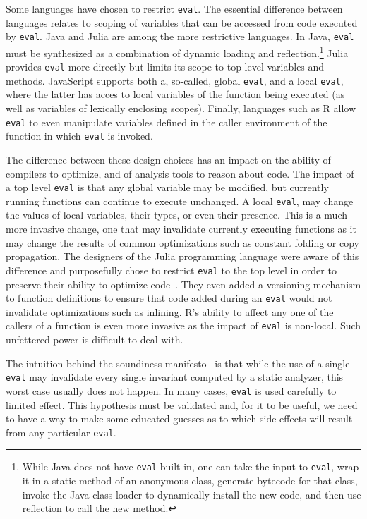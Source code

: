 \documentclass[USenglish,cleveref, autoref, thm-restate]{lipics-v2019}
\newcommand{\eval}{\texttt{eval}\xspace}
\begin{document}
Some languages have chosen to restrict \eval. The essential difference
between languages relates to scoping of variables that can be accessed from
code executed by \eval.  Java and Julia are among the more restrictive
languages. In Java, \eval must be synthesized as a combination of dynamic
loading and reflection.\footnote{While Java does not have \eval built-in,
  one can take the input to \eval, wrap it in a static method of an
  anonymous class, generate bytecode for that class, invoke the Java class
  loader to dynamically install the new code, and then use reflection to
  call the new method.} Julia provides \eval more directly but limits its
scope to top level variables and methods. JavaScript supports both a,
so-called, global \eval, and a local \eval, where the latter has acces to
local variables of the function being executed (as well as variables of
lexically enclosing scopes). Finally, languages such as R allow \eval to
even manipulate variables defined in the caller environment of the function in
which \eval is invoked.

The difference between these design choices has an impact on the ability of
compilers to optimize, and of analysis tools to reason about code. The
impact of a top level \eval is that any global variable may be modified, but
currently running functions can continue to execute unchanged. A local
\eval, may change the values of local variables, their types, or even their
presence. This is a much more invasive change, one that may invalidate
currently executing functions as it may change the results of common
optimizations such as constant folding or copy propagation. The designers of
the Julia programming language were aware of this difference and
purposefully chose to restrict \eval to the top level in order to preserve
their ability to optimize code~\cite{oopsla18a}. They even added a
versioning mechanism to function definitions to ensure that code added
during an \eval would not invalidate optimizations such as inlining.  R's
ability to affect any one of the callers of a function is even more invasive
as the impact of \eval is non-local. Such unfettered power is difficult to
deal with.

The intuition behind the soundiness manifesto~\cite{soundy} is that while
the use of a single \eval may invalidate every single invariant computed by
a static analyzer, this worst case usually does not happen.  In many cases,
\eval is used carefully to limited effect. This hypothesis must be validated
and, for it to be useful, we need to have a way to make some educated
guesses as to which side-effects will result from any particular \eval.
\end{document}
